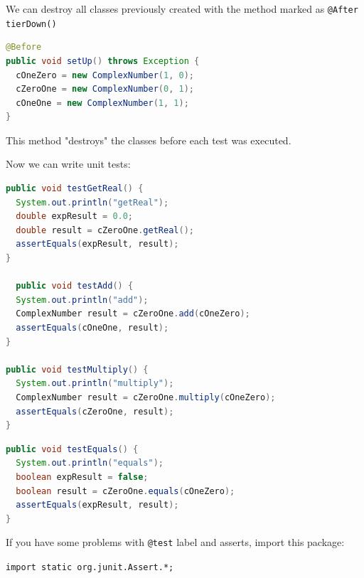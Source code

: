 \documentclass[11pt, xcolor=svgnames]{beamer}
\begin{document}

\begin{frame}[fragile]

We can destroy all classes previously created with the method marked as \texttt{@After tierDown()}

\begin{lstlisting}[language=Java,basicstyle=\tiny]
@Before
public void setUp() throws Exception {
  cOneZero = new ComplexNumber(1, 0);
  cZeroOne = new ComplexNumber(0, 1);
  cOneOne = new ComplexNumber(1, 1);
}
\end{lstlisting}	
This method "destroys" the classes before each test was executed.
\end{frame}


\begin{frame}[fragile]
Now we can write unit tests:

\begin{lstlisting}[language=Java,basicstyle=\tiny]
public void testGetReal() {
  System.out.println("getReal");
  double expResult = 0.0;
  double result = cZeroOne.getReal();
  assertEquals(expResult, result);
}

  public void testAdd() {
  System.out.println("add");
  ComplexNumber result = cZeroOne.add(cOneZero);
  assertEquals(cOneOne, result);
}

public void testMultiply() {
  System.out.println("multiply");
  ComplexNumber result = cZeroOne.multiply(cOneZero);
  assertEquals(cZeroOne, result);
}
\end{lstlisting}
\end{frame}

\begin{frame}[fragile]

\begin{lstlisting}[language=Java,basicstyle=\tiny]
public void testEquals() {
  System.out.println("equals");
  boolean expResult = false;
  boolean result = cZeroOne.equals(cOneZero);
  assertEquals(expResult, result);
}
\end{lstlisting}

If you have some problems with \texttt{@test} label and asserts, import this package:

\texttt{import static org.junit.Assert.*;}

\end{frame}
\end{document}
